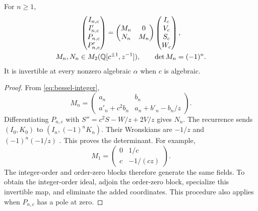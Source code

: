 \begin{lemma}\label{lem:integer}
For $n\ge1$,
\begin{equation}\label{eq:integer-bessel-matrix}
\begin{gathered}
\begin{pmatrix}I_{n,c}\\I'_{n,c}\\P_{n,c}\\P'_{n,c}\end{pmatrix}
=\begin{pmatrix}M_n&0\\N_n&M_n\end{pmatrix}
\begin{pmatrix}I_c\\V_c\\S_c\\W_c\end{pmatrix},\\
M_n,N_n\in M_2(\mathbb{Q}[c^{\pm1},z^{-1}]),\qquad\det M_n=(-1)^n.
\end{gathered}
\end{equation}
It is invertible at every nonzero algebraic $\alpha$ when $c$ is algebraic.
\end{lemma}
\begin{proof}
From \eqref{eq:bessel-integer},
\[
M_n=\begin{pmatrix}a_n&b_n\\a'_n+c^2b_n&a_n+b'_n-b_n/z\end{pmatrix}.
\]
Differentiating $P_{n,c}$ with $S''=c^2S-W/z+2V/z$ gives $N_n$.
The recurrence \mbox{sends} $(I_0,K_0)$ to $(I_n,(-1)^nK_n)$. Their Wronskians
are $-1/z$ and $(-1)^n(-1/z)$ \cite[10.28.2,10.29.1(a),10.29.3(a)--(b)]{DLMF}. This proves the
determinant. For example,
\[ M_1=\begin{pmatrix}0&1/c\\c&-1/(cz)\end{pmatrix}. \]
The integer-order and order-zero blocks therefore generate the same
fields. To obtain the integer-order ideal, adjoin the order-zero block,
specialize this invertible map, and eliminate the added coordinates.
This procedure also applies when $P_{n,c}$ has a pole at zero.
\end{proof}
